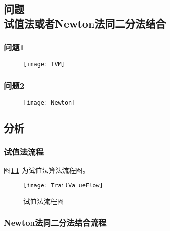 \chapter[第二章]{} %
\label{cha:chapter2}

\section{问题 \\ 试值法或者Newton法同二分法结合}

\subsection{问题1} %
\label{sub:问题1}

\begin{figure}[ht]
\centering
  \texttt{[image: TVM]}
\end{figure}


\subsection{问题2} %
\label{sub:问题2}

\begin{figure}[ht]
\centering
  \texttt{[image: Newton]}
\end{figure}



\section{分析}

\subsection{试值法流程}

图\ref{fig:TrailValueFlow} 为试值法算法流程图。

\begin{figure}[ht]
\centering
  \texttt{[image: TrailValueFlow]}
  \caption{试值法流程图}
  \label{fig:TrailValueFlow}
\end{figure}

\subsection{Newton法同二分法结合流程}

